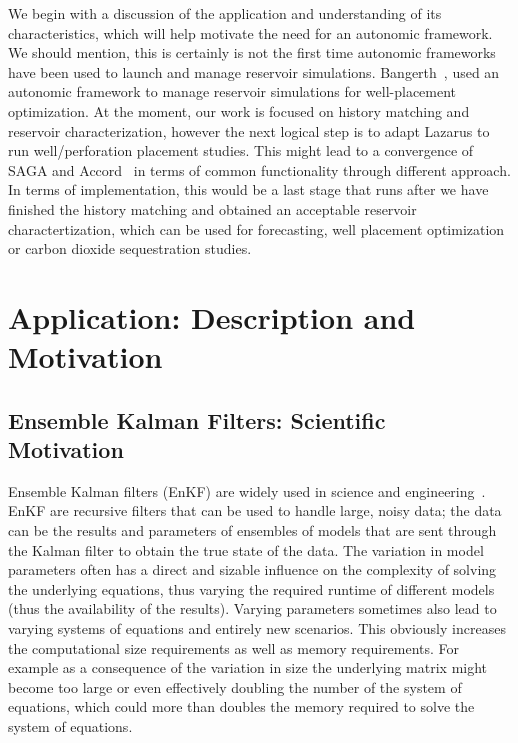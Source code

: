 \documentclass{sig-alternate}
\newcommand{\jhanote}[1]{ {\textcolor{red} { ***Jha: #1 }}}
\newcommand{\jhanote}[1]{}
\begin{document}
We begin with a discussion of the application and
understanding of its characteristics, which will help motivate the
need for an autonomic framework. We should mention, this is certainly
is not the first time autonomic frameworks have been used to launch
and manage reservoir simulations. Bangerth~\cite{bangerth}, used an
autonomic framework to manage reservoir simulations for well-placement
optimization. At the moment, our work is focused on history matching
and reservoir characterization, however the next logical step is to
adapt Lazarus to run well/perforation placement studies. This might
lead to a convergence of SAGA and Accord~\cite{accord} in terms of
common functionality through different approach. In terms of implementation,
this would be a last stage that runs after we have finished
the history matching and obtained an acceptable reservoir charactertization,
which can be used for forecasting, well placement optimization or
carbon dioxide sequestration studies.



\section{Application: Description and \\ Motivation} 

\subsection{Ensemble Kalman Filters: Scientific \\ Motivation}

Ensemble Kalman filters (EnKF) are widely used in science and
engineering~\cite{DataAssim, KalmanPaper}. EnKF are recursive filters
that can be used to handle large, noisy data; the data can be the
results and parameters of ensembles of models that are sent through
the Kalman filter to obtain the true state of the data. The variation
in model parameters often has a direct and sizable influence on the
complexity of solving the underlying equations, thus varying the
required runtime of different models (thus the availability of the
results).  Varying parameters sometimes also lead to varying systems
of equations and entirely new scenarios. This obviously increases the
computational size requirements as well as memory requirements.  For
example as a consequence of the variation in size the underlying
matrix might become too large or even effectively doubling the number
of the system of equations, which could more than doubles the memory
required to solve the system of equations.
\end{document}

